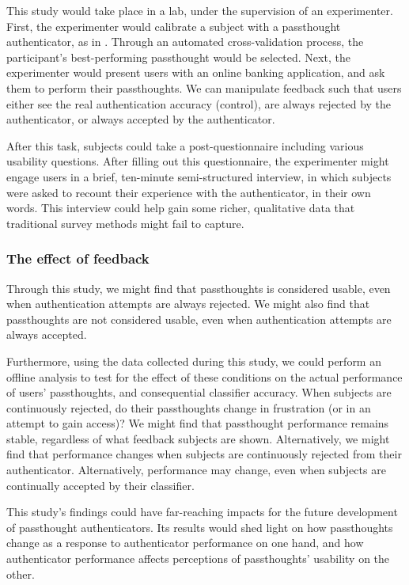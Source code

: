 \documentclass[sigconf]{acmart}
\begin{document}
This study would take place in a lab, under the supervision of an experimenter.
First, the experimenter would calibrate a subject with a passthought authenticator, as in \cite{Chuang2013b}.
Through an automated cross-validation process, the participant's best-performing passthought would be selected.
Next, the experimenter would present users with an online banking application, and ask them to perform their passthoughts.
We can manipulate feedback such that users either see the real authentication accuracy (control), 
are always rejected by the authenticator, 
or always accepted by the authenticator.

After this task, subjects could take a post-questionnaire including various usability questions.
After filling out this questionnaire, the experimenter might engage users in a brief, ten-minute semi-structured interview,
in which subjects were asked to recount their experience with the authenticator, in their own words.
This interview could help gain some richer, qualitative data that traditional survey methods might fail to capture.

\subsubsection{The effect of feedback}
\label{sec:org68a3874}

Through this study, we might find 
that passthoughts is considered usable, even when authentication attempts are always rejected.
We might also find that passthoughts are not considered usable, 
even when authentication attempts are always accepted.

Furthermore, using the data collected during this study, we could perform an offline analysis 
to test for the effect of these conditions on the actual performance of users' passthoughts, and consequential classifier accuracy.
When subjects are continuously rejected, do their passthoughts change in frustration (or in an attempt to gain access)?
We might find that passthought performance 
remains stable, regardless of what feedback subjects are shown.
Alternatively, we might find that performance changes 
when subjects are continuously rejected from their authenticator.
Alternatively, performance may change, 
even when subjects are continually accepted by their classifier.

This study's findings could have far-reaching impacts for the future development of passthought authenticators.
Its results would shed light on how passthoughts change as a response to authenticator performance on one hand,
and how authenticator performance affects perceptions of passthoughts' usability on the other.
\end{document}
